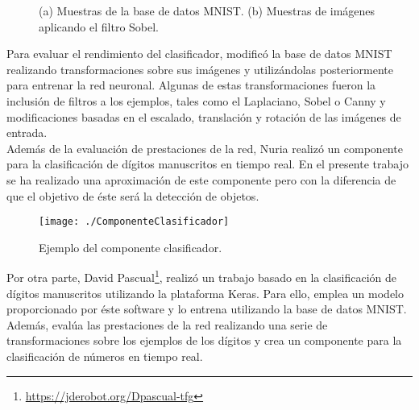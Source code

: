 \documentclass[a4paper, 12pt, spanish, chapterprefix, numbers=noenddot]{book}
\begin{document}
\begin{figure}[H]
\begin{center}
\caption{(a) Muestras de la base de datos MNIST. (b) Muestras de imágenes aplicando el filtro Sobel.}
\label{MNIST}
\end{center}
\end{figure}

Para evaluar el rendimiento del clasificador, modificó la base de datos MNIST realizando transformaciones sobre sus imágenes y utilizándolas posteriormente para entrenar la red neuronal. Algunas de estas transformaciones fueron la inclusión de filtros a los ejemplos, tales como el Laplaciano, Sobel o Canny y modificaciones basadas en el escalado, translación y rotación de las imágenes de entrada.\\

Además de la evaluación de prestaciones de la red, Nuria realizó un componente para la clasificación de dígitos manuscritos en tiempo real. En el presente trabajo se ha realizado una aproximación de este componente pero con la diferencia de que el objetivo de éste será la detección de objetos.

\begin{figure}[H]
\begin{center}
\texttt{[image: ./ComponenteClasificador]}
\caption{Ejemplo del componente clasificador.}
\label{ComponenteClasificador}
\end{center}
\end{figure}

\begin{comment}
Finalmente, Nuria proporciona la información necesaria para abordar el problema de la detección con Caffe. Muestra algunas pruebas realizadas para la mejor compresión de este proceso. El actual trabajo se centrará en la tarea de detección apoyándose en este primer paso dado por Nuria.\\
\end{comment}

Por otra parte, David Pascual\footnote{\url{https://jderobot.org/Dpascual-tfg}}, realizó un trabajo basado en la clasificación de dígitos manuscritos utilizando la plataforma Keras. Para ello, emplea un modelo proporcionado por éste software y lo entrena utilizando la base de datos MNIST. Además, evalúa las prestaciones de la red realizando una serie de transformaciones sobre los ejemplos de los dígitos y crea un componente para la clasificación de números en tiempo real.\\
\end{document}
